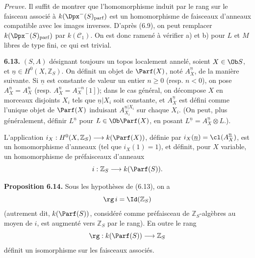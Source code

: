\emph{Preuve.} Il suffit de
montrer que l'homomorphisme induit par le rang sur le faisceau associé à \(k(\Dpx^-(S)_{\mathrm{parf}})\) est un homomorphisme de faisceaux d'anneaux compatible avec les images inverses. D'après (6.9), on peut remplacer \(k(\Dpx^-(S)_{\mathrm{parf}})\) par \(k(\mathcal C_1)\). On est donc ramené à vérifier a) et b) pour \(L\) et \(M\) libres de type fini, ce qui est trivial.

\textbf{6.13.} \((S,A)\) désignant toujours un topos localement annelé, soient \(X\in\Ob S\), et \(\underline n\in H^0(X,\mathbb Z_S)\). On définit un objet de \(\Parf(X)\), noté \(A_X^{\underline n}\), de la manière suivante. Si \(\underline n\) est constante de valeur un entier \(n\geq0\) (resp. \(n<0\)), on pose \(A_X^{\underline n}=A_X^n\) (resp. \(A_X^{\underline n}=A_X^{-n}[1]\)); dans le cas général, on décompose \(X\) en morceaux disjoints \(X_i\) tels que \(\underline n|X_i\) soit constante, et \(A_X^{\underline n}\) est défini comme l'unique objet de \(\Parf(X)\) induisant \(A_{X_i}^{\underline n|X_i}\) sur chaque \(X_i\). (On peut, plus généralement, définir \(L^{\underline n}\) pour \(L\in\Ob\Parf(X)\), en posant \(L^{\underline n}=A_X^{\underline n}\otimes L\).).

L'application \(i_X:H^0(X,\mathbb Z_S)\longrightarrow k(\Parf(X))\), définie par \(i_X(\underline n)=\cl(A_X^{\underline n})\), est un homomorphisme d'anneaux (tel que \(i_X(1)=1\)), et définit, pour \(X\) variable, un homomorphisme de préfaisceaux d'anneaux
\[
  i:\mathbb Z_S\longrightarrow k(\Parf(S)).
\]

\textbf{Proposition 6.14.} Sous les hypothèses de (6.13), on a
\[
  \rg\, i=\Id(\mathbb Z_S)
\]
(autrement dit, \(k(\Parf(S))\), considéré comme préfaisceau de \(\mathbb Z_S\)-algèbres au moyen de \(i\), est augmenté vers \(\mathbb Z_S\) par le rang). En outre le rang
\[
  \rg:k(\Parf(S))\longrightarrow\mathbb Z_S
\]
définit un isomorphisme sur les faisceaux associés.

